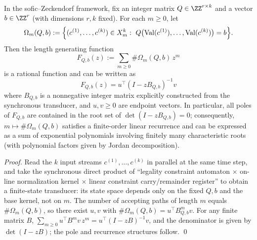 \begin{proposition}\label{prop:conclusion61-rational-gf-linear-constraints}
In the sofic--Zeckendorf framework, fix an integer matrix \(Q\in\ZZ^{r\times k}\) and a vector \(b\in\ZZ^r\) (with dimensions \(r,k\) fixed).
For each \(m\ge 0\), let
\[
\Omega_m(Q,b):=\Bigl\{(c^{(1)},\dots,c^{(k)})\in X_m^k:\ Q\bigl(\mathrm{Val}(c^{(1)}),\dots,\mathrm{Val}(c^{(k)})\bigr)=b\Bigr\}.
\]
Then the length generating function
\[
F_{Q,b}(z):=\sum_{m\ge 0} \#\Omega_m(Q,b)\,z^m
\]
is a rational function and can be written as
\[
\boxed{\;
F_{Q,b}(z)=u^\top(I-zB_{Q,b})^{-1}v\;}
\]
where \(B_{Q,b}\) is a nonneg\-ative integer matrix explicitly constructed from the synchronous transducer, and \(u,v\ge 0\) are endpoint vectors.
In particular, all poles of \(F_{Q,b}\) are contained in the root set of \(\det(I-zB_{Q,b})=0\); consequently, \(m\mapsto \#\Omega_m(Q,b)\) satisfies a finite-order linear recurrence and can be expressed as a sum of exponential polynomials involving finitely many characteristic roots (with polynomial factors given by Jordan decomposition).
\end{proposition}

\begin{proof}
Read the \(k\) input streams \(c^{(1)},\dots,c^{(k)}\) in parallel at the same time step, and take the synchronous direct product of ``legality constraint automaton \(\times\) on-line normalization kernel \(\times\) linear constraint carry/remainder register'' to obtain a finite-state transducer: its state space depends only on the fixed \(Q,b\) and the base kernel, not on \(m\).
The number of accepting paths of length \(m\) equals \(\#\Omega_m(Q,b)\), so there exist \(u,v\) with \(\#\Omega_m(Q,b)=u^\top B_{Q,b}^m v\).
For any finite matrix \(B\),
\(
\sum_{m\ge 0}u^\top B^m v\,z^m=u^\top(I-zB)^{-1}v
\),
and the denominator is given by \(\det(I-zB)\); the pole and recurrence structures follow. \qed
\end{proof}
